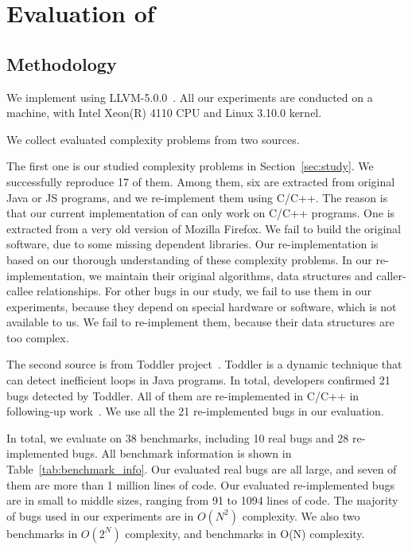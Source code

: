 \section{Evaluation of \Tool}
\label{sec:eva}

\subsection{Methodology}

We implement \Tool using LLVM-5.0.0~\cite{llvm}. 
All our experiments are conducted on a machine, 
with Intel Xeon(R) 4110 CPU and Linux 3.10.0 kernel.


We collect evaluated complexity problems from two sources. 

The first one is our studied complexity problems in Section~\ref{sec:study}.
We successfully reproduce 17 of them. 
Among them, six are extracted from original Java or JS programs, 
and we re-implement them using C/C++.
The reason is that our current implementation of \Tool can only work on C/C++ programs.
One is extracted from a very old version of Mozilla Firefox. 
We fail to build the original software, 
due to some missing dependent libraries. 
Our re-implementation is based on our thorough understanding of these complexity problems.
In our re-implementation, we maintain their original algorithms, 
data structures and caller-callee relationships. 
For other bugs in our study, 
we fail to use them in our experiments, because they depend on special hardware 
or software, which is not available to us. 
We fail to re-implement them, because their data structures are too complex. 

The second source is from Toddler project~\cite{Alabama}. 
Toddler is a dynamic technique that can detect inefficient loops in Java programs.
In total, developers confirmed 21 bugs detected by Toddler. 
All of them are re-implemented in C/C++ 
in following-up work~\cite{ldoctor}.
We use all the 21 re-implemented bugs in our evaluation.  

In total, we evaluate \Tool on 38 benchmarks, 
including 10 real bugs and 28 re-implemented bugs.
All benchmark information is shown in Table~\ref{tab:benchmark_info}. 
Our evaluated real bugs are all large, and seven of them 
are more than 1 million lines of code.
Our evaluated re-implemented bugs are in small to middle sizes, 
ranging from 91 to 1094 lines of code. 
The majority of bugs used in our experiments are in $O(N^2)$ complexity. 
We also two benchmarks in $O(2^N)$ complexity, 
and {\color{red}{XXX}} benchmarks in O(N) complexity.


